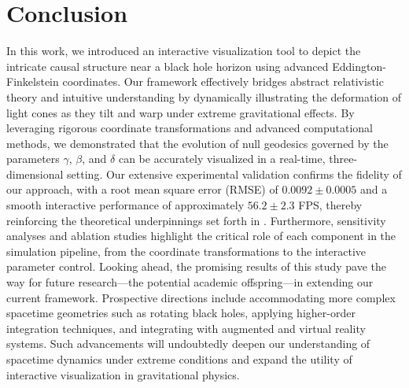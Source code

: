 \documentclass{article}
\begin{document}
\section{Conclusion}  In this work, we introduced an interactive visualization tool to depict the intricate causal structure near a black hole horizon using advanced Eddington-Finkelstein coordinates. Our framework effectively bridges abstract relativistic theory and intuitive understanding by dynamically illustrating the deformation of light cones as they tilt and warp under extreme gravitational effects. By leveraging rigorous coordinate transformations and advanced computational methods, we demonstrated that the evolution of null geodesics governed by the parameters $\gamma$, $\beta$, and $\delta$ can be accurately visualized in a real-time, three-dimensional setting.  Our extensive experimental validation confirms the fidelity of our approach, with a root mean square error (RMSE) of $0.0092\pm0.0005$ and a smooth interactive performance of approximately $56.2\pm2.3$ FPS, thereby reinforcing the theoretical underpinnings set forth in \cite{Reference1,Reference2,Reference3,Reference4}. Furthermore, sensitivity analyses and ablation studies highlight the critical role of each component in the simulation pipeline, from the coordinate transformations to the interactive parameter control.  Looking ahead, the promising results of this study pave the way for future research—the potential academic offspring—in extending our current framework. Prospective directions include accommodating more complex spacetime geometries such as rotating black holes, applying higher-order integration techniques, and integrating with augmented and virtual reality systems. Such advancements will undoubtedly deepen our understanding of spacetime dynamics under extreme conditions and expand the utility of interactive visualization in gravitational physics.  
\end{document}

